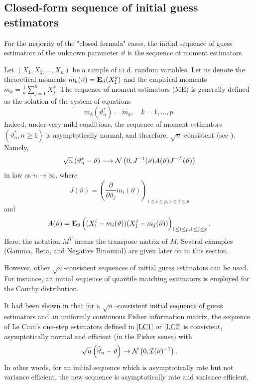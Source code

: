 \subsection{Closed-form sequence of initial guess estimators}\label{sec:closed}

For the majority of the "closed formula" cases, the initial sequence of guess estimators of the unknown parameter $\vartheta$ is the sequence of moment estimators. 

Let $(X_1,X_2, \ldots, X_n)$ be a sample of i.i.d. random variables. Let us denote the theoretical moments $m_k(\vartheta)=\mathbf{E}_\vartheta (X_1^k)$ and the empirical moments $\tilde{m}_k=\frac{1}{n} \sum_{j=1}^n X_j^k$. The sequence of moment estimators (ME) is generally defined as the solution of the system of equations 
$$m_k(\vartheta_n^*) =\tilde{m}_k , \quad k=1,\ldots,p.$$
Indeed, under very mild conditions, the sequence of moment estimators $(\vartheta_n^*, n\geq 1)$ is asymptotically normal, and therefore,  $\sqrt{n}$-consistent (see \cite{IK}). Namely,
\begin{equation}\label{eq:normME} \sqrt{n} \left( \vartheta_n^* - \vartheta \right) \longrightarrow {\cal N}\left(0, J^{-1}(\vartheta) A(\vartheta) J^{-T}(\vartheta)\right)
\end{equation}
in law as $n\rightarrow \infty$, where 
$$J(\vartheta)= \left( \frac{\partial}{\partial \vartheta_j} m_i(\vartheta) \right)_{1\leq i\leq p, 1 \leq j \leq p}$$ 
and 
$$A(\vartheta)=\mathbf{E}_\vartheta \left( (X_1^i - m_i(\vartheta))(X_1^j - m_j(\vartheta)) \right)_{1\leq i\leq p, 1 \leq j \leq p}.$$
Here, the notation $M^T$ means the transpose matrix of $M$. Several examples (Gamma, Beta, and Negative Binomial) are given later on in this section. 

However, other $\sqrt{n}$-consistent sequences of initial guess estimators can be used. For instance, an initial sequence of quantile matching estimators is employed for the Cauchy distribution.

It had been shown in \cite{LeCam} that for a $\sqrt{n}$--consistent initial sequence of guess estimators and an uniformly continuous Fisher information matrix, the sequence of Le Cam's one-step estimators
defined in \eqref{LC1} or \eqref{LC2} is consistent, asymptotically normal and efficient (in the Fisher sense) with
$$ \sqrt{n}\left( \widehat{\vartheta}_n-\vartheta \right) \rightarrow {\cal N}\left(0,{\cal I}(\vartheta)^{-1}\right).$$
In other words, for an initial sequence which is asymptotically rate but not variance efficient, the new sequence is asymptotically rate and variance efficient. 


